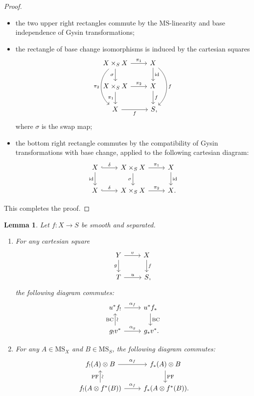 \documentclass{amsart}
\numberwithin{equation}{section}
\theoremstyle{plain}
\newtheorem{lemma}[equation]{Lemma}
\theoremstyle{definition}
\def\id{\mathrm{id}}
\def\MS{\mathrm{MS}}
\begin{document}
\begin{proof}
\begin{itemize}
		\item the two upper right rectangles commute by the $\MS$-linearity and base independence of Gysin transformations;
		\item the rectangle of base change isomorphisms is induced by the cartesian squares
		\[
		\begin{tikzcd}
			X\times_SX \ar{d}[swap]{\sigma} \ar{r}{\pi_1} \ar[bend right=50]{dd}[swap]{\pi_2} & X \ar{d}{\id} \ar[bend left=50]{dd}{f} \\
			X\times_SX \ar{d}[swap]{\pi_1} \ar{r}{\pi_2} & X \ar{d}{f} \\
			X \ar{r}[swap]{f} & S\rlap,
		\end{tikzcd}
		\]
		where $\sigma$ is the swap map;
		\item the bottom right rectangle commutes by the compatibility of Gysin transformations with base change, applied to the following cartesian diagram:
		\[
		\begin{tikzcd}
			X \ar[hook]{r}{\delta} \ar{d}[swap]{\id} & X\times_SX \ar{d}[swap]{\sigma} \ar{r}{\pi_1} & X \ar{d}{\id} \\
			X \ar[hook]{r}{\delta} & X\times_SX \ar{r}{\pi_2} & X\rlap.
		\end{tikzcd}
		\]
	\end{itemize}
	This completes the proof.
\end{proof}


\begin{lemma}
	\label{lem:smooth-proper-BC}
	Let $f\colon X\to S$ be smooth and separated.
	\begin{enumerate}
		\item For any cartesian square
		\[
		\begin{tikzcd}
			Y \ar{r}{v} \ar{d}[swap]{g} & X \ar{d}{f} \\
			T \ar{r}{u} & S\rlap,
		\end{tikzcd}
		\]
		the following diagram commutes:
		\[
		\begin{tikzcd}
			u^* f_! \ar{r}{\alpha_f} & u^* f_* \ar{d}{\mathrm{BC}} \\
			g_! v^* \ar{u}{\mathrm{BC}}[sloped,swap]{\sim} \ar{r}{\alpha_g} & g_*v^*\rlap.
		\end{tikzcd}
		\]
		\item For any $A\in\MS_X$ and $B\in\MS_S$, the following diagram commutes:
		\[
		\begin{tikzcd}
			f_!(A)\otimes B \ar{r}{\alpha_f} & f_*(A)\otimes B \ar{d}{\mathrm{PF}} \\
			f_!(A\otimes f^*(B)) \ar{u}{\mathrm{PF}}[sloped,swap]{\sim} \ar{r}{\alpha_f} & f_*(A\otimes f^*(B))\rlap.
		\end{tikzcd}
		\]
	\end{enumerate}
\end{lemma}
\end{document}
